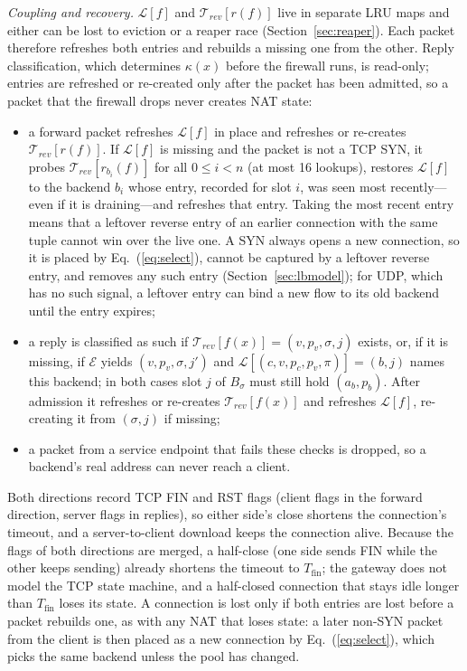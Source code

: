 \documentclass[conference]{IEEEtran}
\begin{document}
\textit{Coupling and recovery.} $\mathcal{L}[f]$ and $\mathcal{T}_{rev}[r(f)]$
live in separate LRU maps and either can be lost to eviction or a reaper race
(Section~\ref{sec:reaper}). Each packet therefore refreshes both entries and
rebuilds a missing one from the other. Reply classification, which
determines $\kappa(x)$ before the firewall runs, is read-only; entries are
refreshed or re-created only after the packet has been admitted, so a packet
that the firewall drops never creates NAT state:
\begin{itemize}
\item a forward packet refreshes $\mathcal{L}[f]$ in place and refreshes or
re-creates $\mathcal{T}_{rev}[r(f)]$. If $\mathcal{L}[f]$ is missing and the
packet is not a TCP SYN, it probes $\mathcal{T}_{rev}[r_{b_i}(f)]$ for
all $0 \le i < n$ (at most 16 lookups), restores $\mathcal{L}[f]$ to the
backend $b_i$ whose entry, recorded for slot $i$, was seen most recently---even
if it is draining---and refreshes that entry. Taking the most recent entry
means that a leftover reverse entry of an earlier connection with the same
tuple cannot win over the live one. A SYN always opens a new connection, so
it is placed by Eq.~(\ref{eq:select}), cannot be captured by a leftover
reverse entry, and removes any such entry (Section~\ref{sec:lbmodel}); for UDP, which has no such signal, a leftover entry can bind a
new flow to its old backend until the entry expires;
\item a reply is classified as such if $\mathcal{T}_{rev}[f(x)] =
(v,p_v,\sigma,j)$ exists, or, if it is missing, if $\mathcal{E}$ yields
$(v,p_v,\sigma,j')$ and $\mathcal{L}[(c,v,p_c,p_v,\pi)] = (b,j)$ names this
backend; in both cases slot $j$ of $B_\sigma$ must still hold $(a_b,p_b)$.
After admission it refreshes or re-creates $\mathcal{T}_{rev}[f(x)]$ and
refreshes $\mathcal{L}[f]$, re-creating it from $(\sigma,j)$ if missing;
\item a packet from a service endpoint that fails these checks is dropped,
so a backend's real address can never reach a client.
\end{itemize}
Both directions record TCP FIN and RST flags (client flags in the forward
direction, server flags in replies), so either side's close shortens the
connection's timeout, and a server-to-client download keeps the connection
alive. Because the flags of both directions are merged, a half-close (one
side sends FIN while the other keeps sending) already shortens the timeout to
$T_{\mathrm{fin}}$; the gateway does not model the TCP state machine, and a
half-closed connection that stays idle longer than $T_{\mathrm{fin}}$ loses
its state. A connection is lost only if both entries are lost before a packet
rebuilds one, as with any NAT that loses state: a later non-SYN packet from
the client is then placed as a new connection by Eq.~(\ref{eq:select}), which
picks the same backend unless the pool has changed.
\end{document}
